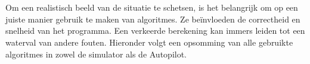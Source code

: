 
\\
\\
Om een realistisch beeld van de situatie te schetsen, is het belangrijk om op een juiste manier gebruik te maken van algoritmes. Ze be\"invloeden de correctheid en snelheid van het programma. Een verkeerde berekening kan immers leiden tot een waterval van andere fouten. Hieronder volgt een opsomming van alle gebruikte algoritmes in zowel de simulator als de Autopilot.
